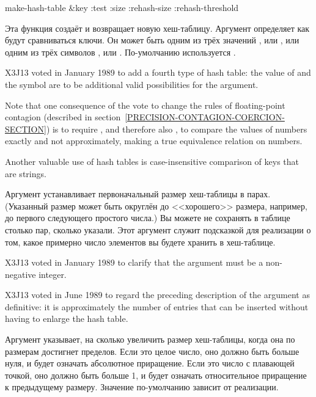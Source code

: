 \begin{defun}[Функция]
make-hash-table &key :test :size :rehash-size :rehash-threshold

Эта функция создаёт и возвращает новую хеш-таблицу.
Аргумент  определяет как будут сравниваться ключи.
Он может быть одним из трёх значений ,  или ,
или одним из трёх символов ,  или .
По-умолчанию используется .

\begin{new}
X3J13 voted in January 1989
to add a fourth type of hash table:
the value of  and the symbol  are to be additional
valid possibilities for the  argument.

Note that one consequence of
the vote to change the rules of
floating-point contagion
(described in section~\ref{PRECISION-CONTAGION-COERCION-SECTION})
is to require \cdf{=}, and therefore also ,
to compare the values of numbers exactly and not approximately, making
 a true equivalence relation on numbers.

Another valuable use of  hash tables is case-insensitive
comparison of keys that are strings.
\end{new}

Аргумент  устанавливает первоначальный размер хеш-таблицы в парах.
(Указанный размер может быть округлён до <<хорошего>> размера, например, до
первого следующего простого числа.)
Вы можете не сохранять в таблице столько пар, сколько указали. Этот аргумент
служит подсказкой для реализации о том, какое примерно число элементов вы будете
хранить в хеш-таблице.

\begin{new}
X3J13 voted in January 1989
to clarify that the  argument
must be a non-negative integer.
\end{new}

\begin{newer}
X3J13 voted in June 1989  to regard the
preceding description of the  argument as definitive: it
is approximately the number of entries that can be inserted
without having to enlarge the hash table.
\end{newer}

Аргумент  указывает, на сколько увеличить размер хеш-таблицы,
когда она по размерам достигнет пределов.
Если это целое число, оно должно быть больше нуля, и будет означать абсолютное
приращение. Если это число с плавающей точкой, оно должно быть больше 1, и будет
означать относительное приращение к предыдущему размеру.
Значение по-умолчанию зависит от реализации.


\end{defun}
